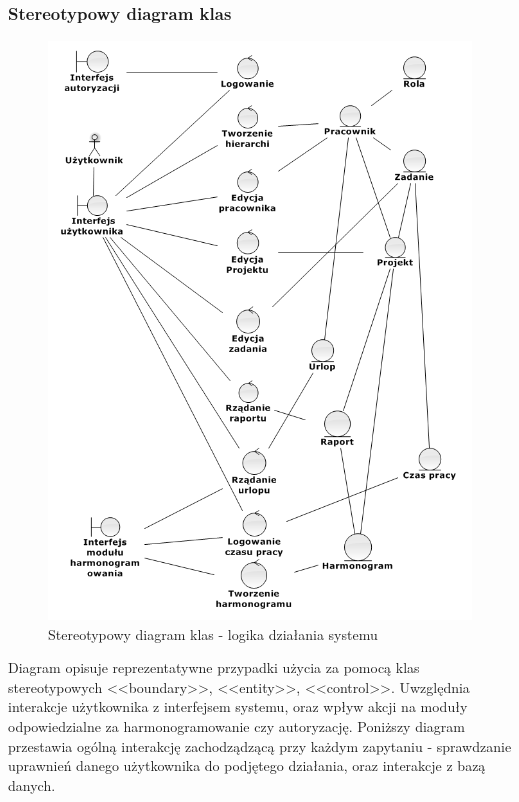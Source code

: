 \subsubsection{Stereotypowy diagram klas}
\begin{adjustwidth}{4em}{0pt}

\begin{figure}[H]
    \centering
    \includegraphics[scale=0.8]{diagramy/modelKlas/Robustnessdiagram1.png}
    \caption{Stereotypowy diagram klas - logika działania systemu}
    \label{fig:logika}
\end{figure}

Diagram opisuje reprezentatywne przypadki użycia za pomocą klas stereotypowych <<boundary>>, <<entity>>, <<control>>. Uwzględnia interakcje użytkownika z interfejsem systemu, oraz wpływ akcji na moduły odpowiedzialne za harmonogramowanie czy autoryzację.\newline
Poniższy diagram przestawia ogólną interakcję zachodządzącą przy każdym zapytaniu - sprawdzanie uprawnień danego użytkownika do podjętego działania, oraz interakcje z bazą danych.


\end{adjustwidth}
